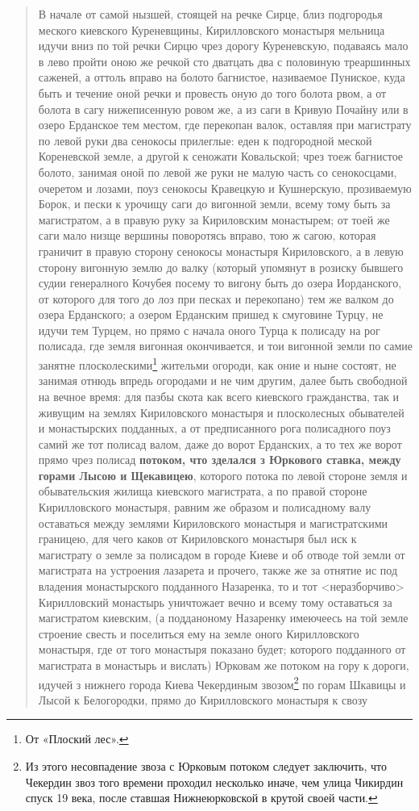\begin{quotation}
В начале от самой нызшей, стоящей на речке Сирце, близ подгородья меского киевского Куреневщины, Кирилловского монастыря мельница идучи вниз по той речки Сирцю чрез дорогу Куреневскую, подаваясь мало в лево пройти оною же речкой сто дватцать два с половиную треаршинных саженей, а оттоль вправо на болото багнистое, називаемое Пуниское, куда быть и течение оной речки и провесть оную до того болота рвом, а от болота в сагу нижеписенную ровом же, а из саги в Кривую Почайну или в озеро Ерданское тем местом, где перекопан валок, оставляя при магистрату по левой руки два сенокосы прилеглые: еден к подгородной меской Кореневской земле, а другой к сеножати Ковальской; чрез тоеж багнистое болото, занимая оной по левой же руки не малую часть со сенокосцами, очеретом и лозами, поуз сенокосы Кравецкую и Кушнерскую, прозиваемую Борок, и пески к урочищу саги до вигонной земли, всему тому быть за магистратом, а в правую руку за Кириловским монастырем; от тоей же саги мало низще вершины поворотясь вправо, тою ж сагою, которая граничит в правую сторону сенокосы монастыря Кириловского, а в левую сторону вигонную землю до валку (который упомянут в розиску бывшего судии генералного Кочубея посему то вигону быть до озера Иорданского, от которого для того до лоз при песках и перекопано) тем же валком до озера Ерданского; а озером Ерданским пришед к смуговине Турцу, не идучи тем Турцем, но прямо с начала оного Турца к полисаду на рог полисада, где земля вигонная окончивается, и тои вигонной земли по самие занятне плосколескими\footnote{От «Плоский лес».} жительми огороди, как оние и ныне состоят, не занимая отнюдь впредь огородами и не чим другим, далее быть свободной на вечное время: для пазбы скота как всего киевского гражданства, так и живущим на землях Кириловского монастыря и плосколесных обывателей и монастырских подданных, а от предписанного рога полисадного поуз самий же тот полисад валом, даже до ворот Ерданских, а то тех же ворот прямо чрез полисад \textbf{потоком, что зделался з Юркового ставка, между горами Лысою и Щекавицею}, которого потока по левой стороне земля и обывательския жилища киевского магистрата, а по правой стороне Кирилловского монастыря, равним же образом и полисадному валу оставаться между землями Кириловского монастыря и магистратскими границею, для чего каков от Кириловского монастыря был иск к магистрату о земле за полисадом в городе Киеве и об отводе той земли от магистрата на устроения лазарета и прочего, также же за отнятие ис под владения монастырского подданного Назаренка, то и тот <неразборчиво> Кирилловский монастырь уничтожает вечно и всему тому оставаться за магистратом киевским, (а подданоному Назаренку имеючеесь на той земле строение свесть и поселиться ему на земле оного Кирилловского монастыря, где от того монастыря показано будет; которого подданного от магистрата в монастырь и вислать) Юрковам же потоком на гору к дороги, идучей з нижнего города Киева Чекердиным звозом\footnote{Из этого несовпадение звоза с Юрковым потоком следует заключить, что Чекердин звоз того времени проходил несколько иначе, чем улица Чикирдин спуск 19 века, после ставшая Нижнеюрковской в крутой своей части. } по горам Шкавицы и Лысой к Белогородки, прямо до Кирилловского монастыря к свозу 
\end{quotation}
